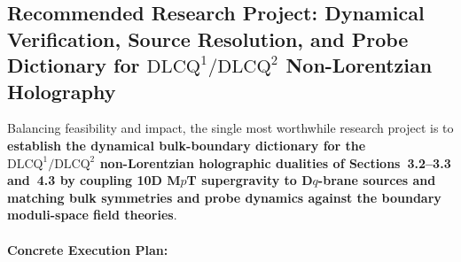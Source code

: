 \documentclass[11pt,a4paper]{article}
\begin{document}
\subsection*{Recommended Research Project: Dynamical Verification, Source Resolution, and Probe Dictionary for $\text{DLCQ}^1/\text{DLCQ}^2$ Non-Lorentzian Holography}

Balancing feasibility and impact, the single most worthwhile research project is to \textbf{establish the dynamical bulk-boundary dictionary for the $\text{DLCQ}^1/\text{DLCQ}^2$ non-Lorentzian holographic dualities of Sections~3.2--3.3 and~4.3 by coupling 10D M$p$T supergravity to D$q$-brane sources and matching bulk symmetries and probe dynamics against the boundary moduli-space field theories}.

\paragraph{Concrete Execution Plan:}
\end{document}
